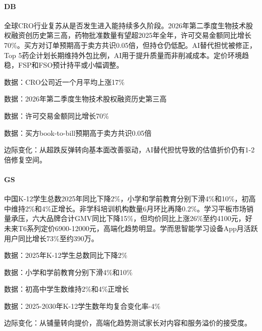 \documentclass[11pt]{ctexart}
\begin{document}
\paragraph{DB} 全球CRO行业复苏从是否发生进入能持续多久阶段。2026年第二季度生物技术股权融资创历史第三高，药物批准数量有望超2025年全年，许可交易金额同比增长70\%。买方对订单预期高于卖方共识0.05倍，但持仓仍低配。AI替代担忧被修正，Top 5药企计划长期维持外包比例，AI用于提升质量而非削减成本。定价环境趋稳，FSP和FSO预计持平或小幅调整。
{\small\color{refgray}数据：CRO公司近一个月平均上涨17\%\par}
{\small\color{refgray}数据：2026年第二季度生物技术股权融资历史第三高\par}
{\small\color{refgray}数据：许可交易金额同比增长70\%\par}
{\small\color{refgray}数据：买方book-to-bill预期高于卖方共识0.05倍\par}
{\small\color{refgray}边际变化：从超跌反弹转向基本面改善驱动，AI替代担忧导致的估值折价仍有1-2倍修复空间。\par}
\paragraph{GS} 中国K-12学生总数2025年同比下降2\%，小学和学前教育分别下滑4\%和10\%，初高中维持2\%和4\%正增长。非学科培训机构数量6月环比再降0.2\%。学习平板市场销量承压，六大品牌合计GMV同比下降15\%，但均价同比上涨26\%至约4100元，好未来T6系列定价6900-12000元，高端化趋势明显。学而思智能学习设备App月活跃用户同比增长73\%至约390万。
{\small\color{refgray}数据：2025年K-12学生总数同比下降2\%\par}
{\small\color{refgray}数据：小学和学前教育分别下滑4\%和10\%\par}
{\small\color{refgray}数据：初高中学生数维持2\%和4\%正增长\par}
{\small\color{refgray}数据：2025-2030年K-12学生数年均复合变化率-4\%\par}
{\small\color{refgray}边际变化：从铺量转向提价，高端化趋势测试家长对内容和服务溢价的接受度。\par}
\end{document}
